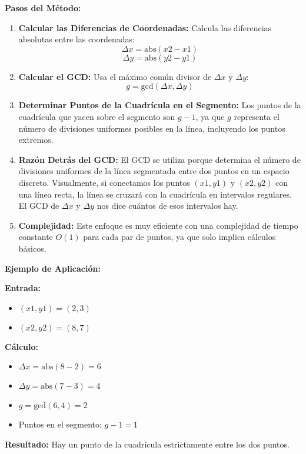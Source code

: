 \textbf{Pasos del Método:}
\begin{enumerate}
    \item \textbf{Calcular las Diferencias de Coordenadas:} Calcula las diferencias absolutas entre las coordenadas:
    \[
    \Delta x = \text{abs}(x2 - x1)
    \]
    \[
    \Delta y = \text{abs}(y2 - y1)
    \]
    
    \item \textbf{Calcular el GCD:} Usa el máximo común divisor de $\Delta x$ y $\Delta y$:
    \[
    g = \text{gcd}(\Delta x, \Delta y)
    \]
    
    \item \textbf{Determinar Puntos de la Cuadrícula en el Segmento:} Los puntos de la cuadrícula que yacen sobre el segmento son $g - 1$, ya que $g$ representa el número de divisiones uniformes posibles en la línea, incluyendo los puntos extremos.
    
    \item \textbf{Razón Detrás del GCD:} El GCD se utiliza porque determina el número de divisiones uniformes de la línea segmentada entre dos puntos en un espacio discreto. Visualmente, si conectamos los puntos $(x1, y1)$ y $(x2, y2)$ con una línea recta, la línea se cruzará con la cuadrícula en intervalos regulares. El GCD de $\Delta x$ y $\Delta y$ nos dice cuántos de esos intervalos hay.
    
    \item \textbf{Complejidad:} Este enfoque es muy eficiente con una complejidad de tiempo constante $O(1)$ para cada par de puntos, ya que solo implica cálculos básicos.
\end{enumerate}

\textbf{Ejemplo de Aplicación:}

\textbf{Entrada:}
\begin{itemize}
    \item $(x1, y1) = (2, 3)$
    \item $(x2, y2) = (8, 7)$
\end{itemize}

\textbf{Cálculo:}
\begin{itemize}
    \item $\Delta x = \text{abs}(8 - 2) = 6$
    \item $\Delta y = \text{abs}(7 - 3) = 4$
    \item $g = \text{gcd}(6, 4) = 2$
    \item Puntos en el segmento: $g - 1 = 1$
\end{itemize}

\textbf{Resultado:} Hay un punto de la cuadrícula estrictamente entre los dos puntos.

